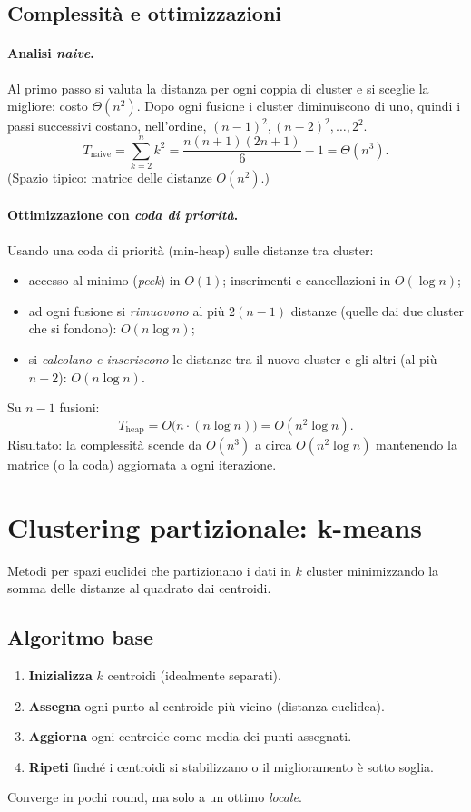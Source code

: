 \subsection{Complessità e ottimizzazioni}\label{subsec:hclust-compl}

\paragraph{Analisi \emph{naive}.}
Al primo passo si valuta la distanza per ogni coppia di cluster e si sceglie la migliore: costo $\Theta(n^2)$.
Dopo ogni fusione i cluster diminuiscono di uno, quindi i passi successivi costano, nell’ordine,
$(n-1)^2,(n-2)^2,\dots,2^2$.
\[
T_{\text{naive}}
=\sum_{k=2}^{n} k^{2}
=\frac{n(n+1)(2n+1)}{6}-1
=\Theta(n^{3}).
\]
(Spazio tipico: matrice delle distanze $O(n^2)$.)

\paragraph{Ottimizzazione con \emph{coda di priorità}.}
Usando una coda di priorità (min-heap) sulle distanze tra cluster:
\begin{itemize}
  \item accesso al minimo (\emph{peek}) in $O(1)$; inserimenti e cancellazioni in $O(\log n)$;
  \item ad ogni fusione si \emph{rimuovono} al più $2(n-1)$ distanze (quelle dai due cluster che si fondono): $O(n\log n)$;
  \item si \emph{calcolano e inseriscono} le distanze tra il nuovo cluster e gli altri (al più $n-2$): $O(n\log n)$.
\end{itemize}
Su $n-1$ fusioni:
\[
T_{\text{heap}}=O\big(n \cdot (n\log n)\big)=O(n^{2}\log n).
\]
Risultato: la complessità scende da $O(n^{3})$ a circa $O(n^{2}\log n)$ mantenendo la matrice (o la coda) aggiornata a ogni iterazione.


\section{Clustering partizionale: k-means}\label{sec:kmeans}
Metodi per spazi euclidei che partizionano i dati in $k$ cluster minimizzando la somma delle distanze al quadrato dai centroidi.

\subsection{Algoritmo base}\label{subsec:kmeans-basic}
\begin{enumerate}
  \item \textbf{Inizializza} $k$ centroidi (idealmente separati).
  \item \textbf{Assegna} ogni punto al centroide più vicino (distanza euclidea).
  \item \textbf{Aggiorna} ogni centroide come media dei punti assegnati.
  \item \textbf{Ripeti} finché i centroidi si stabilizzano o il miglioramento è sotto soglia.
\end{enumerate}
Converge in pochi round, ma solo a un ottimo \emph{locale}.

